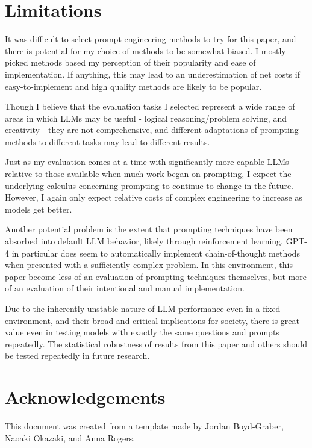 \documentclass[11pt]{article}
\begin{document}
\section*{Limitations}

It was difficult to select prompt engineering methods to try for this paper, and there is potential for my choice of methods to be somewhat biased. I mostly picked methods based my perception of their popularity and ease of implementation. If anything, this may lead to an underestimation of net costs if easy-to-implement and high quality methods are likely to be popular. 

Though I believe that the evaluation tasks I selected represent a wide range of areas in which LLMs may be useful - logical reasoning/problem solving, and creativity - they are not comprehensive, and different adaptations of prompting methods to different tasks may lead to different results.

Just as my evaluation comes at a time with significantly more capable LLMs relative to those available when much work began on prompting, I expect the underlying calculus concerning prompting to continue to change in the future. However, I again only expect relative costs of complex engineering to increase as models get better.

Another potential problem is the extent that prompting techniques have been absorbed into default LLM behavior, likely through reinforcement learning. GPT-4 in particular does seem to automatically implement chain-of-thought methods when presented with a sufficiently complex problem. In this environment, this paper become less of an evaluation of prompting techniques themselves, but more of an evaluation of their intentional and manual implementation.

Due to the inherently unstable nature of LLM performance even in a fixed environment, and their broad and critical implications for society, there is great value even in testing models with exactly the same questions and prompts repeatedly. The statistical robustness of results from this paper and others should be tested repeatedly in future research.

\section*{Acknowledgements}
This document was created from a template made by Jordan Boyd-Graber, Naoaki Okazaki, and Anna Rogers.



\end{document}
